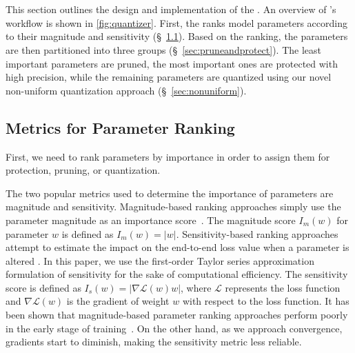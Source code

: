 


\section{\quantizer}
\label{sec:quantization}

This section outlines the design and implementation of the \quantizer. An overview of \quantizer's workflow is shown in \autoref{fig:quantizer}. First, the \quantizer ranks model parameters according to their magnitude and sensitivity (\S~\ref{sec:ranking}). Based on the ranking, the parameters are then partitioned into three groups (\S~\ref{sec:pruneandprotect}). The least important parameters are pruned, the most important ones are protected with high precision, while the remaining parameters are quantized using our novel non-uniform quantization approach (\S~\ref{sec:nonuniform}). 







\subsection{Metrics for Parameter Ranking}
\label{sec:ranking}
First, we need to rank parameters by importance in order to assign them for protection, pruning, or quantization.

The two popular metrics used to determine the importance of parameters are magnitude and sensitivity. Magnitude-based ranking approaches simply use the parameter magnitude as an importance score~\cite{han2015learning}. The magnitude score $I_m(w)$ for parameter $w$ is defined as $I_m(w) = |w|$. Sensitivity-based ranking approaches attempt to estimate the impact on the end-to-end loss value when a parameter is altered \cite{lecun1989optimal,dong2019hawq}. In this paper, we use the first-order Taylor series approximation formulation of sensitivity for the sake of computational efficiency. 
The sensitivity score is defined as $I_s(w) = |\nabla\mathcal{L}(w) w|$, where $\mathcal{L}$ represents the loss function and $\nabla\mathcal{L}(w)$ is the gradient of weight $w$ with respect to the loss function. It has been shown that magnitude-based parameter ranking approaches perform poorly in the early stage of training~\cite{when-to-prune}. On the other hand, as we approach convergence, gradients start to diminish, making the sensitivity metric less reliable. 




